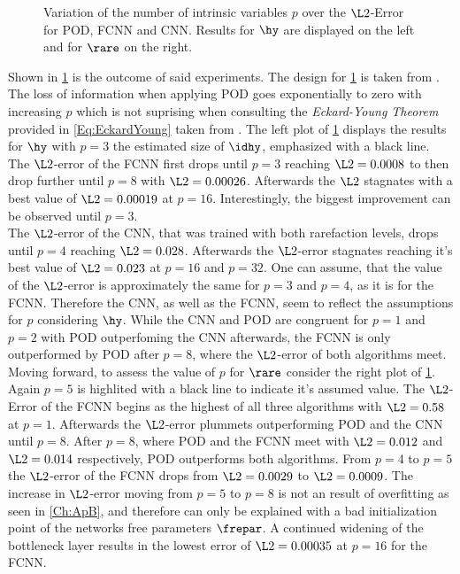 \begin{figure}[htbp!]
	
	\caption{Variation of the number of intrinsic variables \(p\) over the $\L2$-Error for POD, FCNN and CNN. Results for $\hy$ are displayed on the left and for $\rare$ on the right.}
	\label{Fig:IntVar}
\end{figure}
Shown in \cref{Fig:IntVar} is the outcome of said experiments. The design for \cref{Fig:IntVar} is taken from \cite{Carlberg}. The loss of information when applying POD goes exponentially to zero with increasing $p$ which is not suprising when consulting the \textit{Eckard-Young Theorem} provided in \cref{Eq:EckardYoung} taken from \cite{Kutz}.
The left plot of \cref{Fig:IntVar} displays the results for $\hy$ with $p=3$ the estimated size of \(\idhy\), emphasized with a black line. The \(\L2\)-error of the FCNN first drops until $p = 3$ reaching \(\L2 = 0.0008\) to then drop further until \(p=8\) with \(\L2=0.00026\). Afterwards the \(\L2\) stagnates with a best value of \(\L2=0.00019\) at \(p=16\). Interestingly, the biggest improvement can be observed until \(p=3\).\\
The \(\L2\)-error of the CNN, that was trained with both rarefaction levels, drops until \(p=4\) reaching \(\L2=0.028\). Afterwards the \(\L2\)-error stagnates reaching it's best value of \(\L2=0.023\) at \(p=16\) and \(p=32\). One can assume, that the value of the \(\L2\)-error is approximately the same for \(p=3\) and \(p=4\), as it is for the FCNN. Therefore the CNN, as well as the FCNN, seem to reflect the assumptions for \(p\) considering \(\hy\). While the CNN and POD are congruent for \(p=1\) and \(p=2\) with POD outperfoming the CNN afterwards, the FCNN is only outperformed by POD after \(p=8\), where the \(\L2\)-error of both algorithms meet.\\ 
Moving forward, to assess the value of \(p\) for $\rare$ consider the right plot of \cref{Fig:IntVar}. Again \(p=5\) is highlited with a black line to indicate it's assumed value. The $\L2$-Error of the FCNN begins as the highest of all three algorithms with \(\L2=0.58\) at \(p=1\). Afterwards the \(\L2\)-error plummets outperforming POD and the CNN until \(p=8\). After \(p=8\), where POD and the FCNN meet with \(\L2=0.012\) and \(\L2=0.014\) respectively, POD outperforms both algorithms. From \(p=4\) to \(p=5\) the \(\L2\)-error of the FCNN drops from \(\L2=0.0029\) to \(\L2=0.0009\). The increase in \(\L2\)-error moving from $p=5$ to $p=8$ is not an result of overfitting as seen in \cref{Ch:ApB}, and therefore can only be explained with a bad initialization point of the networks free parameters $\frepar$. A continued widening of the bottleneck layer results in the lowest error of \(\L2=0.00035\) at \(p=16\) for the FCNN.\\
